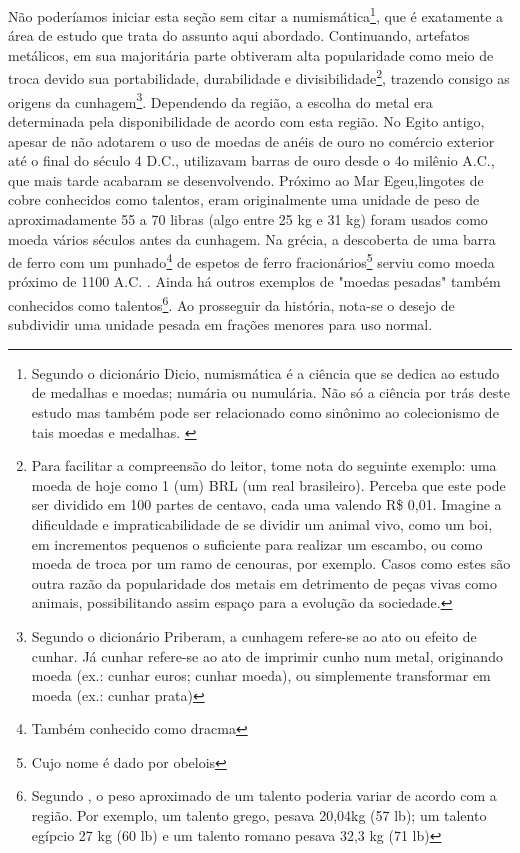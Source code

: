 Não poderíamos iniciar esta seção sem citar a numismática\footnote{Segundo o dicionário Dicio, numismática é a ciência que se dedica ao estudo de medalhas e moedas; numária ou numulária. Não só a ciência por trás deste estudo mas também pode ser relacionado como sinônimo ao colecionismo de tais moedas e medalhas. \cite{DICIONUM}}, que é exatamente a área de estudo que trata do assunto aqui abordado. Continuando,  artefatos metálicos, em sua majoritária parte obtiveram alta popularidade como meio de troca devido sua portabilidade, durabilidade e divisibilidade\footnote{ Para facilitar a compreensão do leitor, tome nota do seguinte exemplo: uma moeda de hoje como 1 (um) BRL (um real brasileiro). Perceba que este pode ser dividido em 100 partes de centavo, cada uma valendo R\$ 0,01. Imagine a dificuldade e impraticabilidade de se dividir um animal vivo, como um boi, em incrementos pequenos o suficiente para realizar um escambo, ou como moeda de troca por um ramo de cenouras, por exemplo. Casos como estes são outra razão da popularidade dos metais em detrimento de peças vivas como animais, possibilitando assim espaço para a evolução da sociedade.}, trazendo consigo as origens da cunhagem\footnote{Segundo o dicionário Priberam, a cunhagem refere-se ao ato ou efeito de cunhar. Já cunhar refere-se ao ato de imprimir cunho num metal, originando moeda (ex.: cunhar euros; cunhar moeda), ou simplemente transformar em moeda (ex.: cunhar prata)\cite{PRIBERAM1}}. Dependendo da região, a escolha do metal era determinada pela disponibilidade de acordo com esta região.
No Egito antigo, apesar de não adotarem o uso de moedas de anéis de ouro no comércio exterior até o final do século 4 D.C., utilizavam barras de ouro desde o 4o milênio A.C., que mais tarde acabaram se desenvolvendo. Próximo ao Mar Egeu, ​​lingotes de cobre conhecidos como talentos, eram originalmente uma unidade de peso de aproximadamente 55 a 70 libras (algo entre 25 kg e 31 kg) foram usados ​​como moeda vários séculos antes da cunhagem. Na grécia, a descoberta de uma barra de ferro com um punhado\footnote{Também conhecido como dracma} de espetos de ferro fracionários\footnote{Cujo nome é dado por obelois} serviu como moeda próximo de 1100 A.C. . Ainda há outros exemplos de "moedas pesadas" também conhecidos como talentos\footnote{Segundo \cite{HUMPHREY}, o peso aproximado de um talento poderia variar de acordo com a região. Por exemplo, um talento grego, pesava 20,04kg (57 lb); um talento egípcio 27 kg (60 lb) e um talento romano pesava 32,3 kg (71 lb)}. Ao prosseguir da história, nota-se o desejo de subdividir uma unidade pesada em frações menores para uso normal. \\

